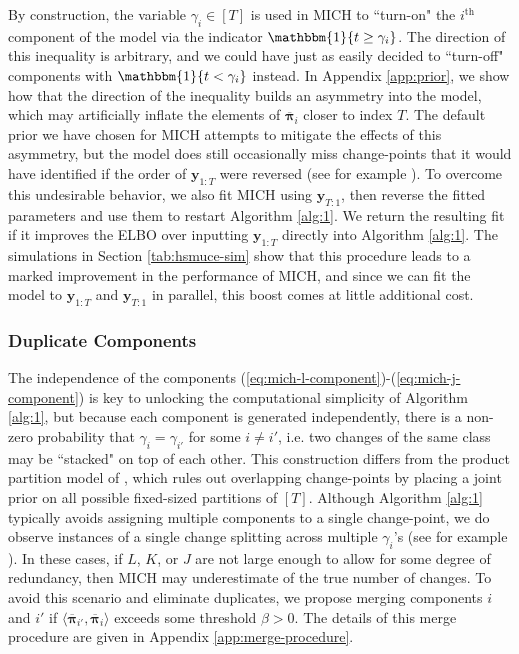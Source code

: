 By construction, the variable $\gamma_i \in [T]$ is used in MICH to ``turn-on" the $i^{\text{th}}$ component of the model via the indicator $\mathbbm{1}\{t \geq \gamma_i\}$. The direction of this inequality is arbitrary, and we could have just as easily decided to ``turn-off" components with  $\mathbbm{1}\{t < \gamma_i\}$ instead. In Appendix \ref{app:prior}, we show how that the direction of the inequality builds an asymmetry into the model, which may artificially inflate the elements of $\overline{\boldsymbol{\pi}}_{i}$ closer to index $T$. The default prior we have chosen for MICH attempts to mitigate the effects of this asymmetry, but the model does still occasionally miss change-points that it would have identified if the order of $\mathbf{y}_{1:T}$ were reversed (see for example ). To overcome this undesirable behavior, we also fit MICH using $\mathbf{y}_{T:1}$, then reverse the fitted parameters and use them to restart Algorithm \ref{alg:1}. We return the resulting fit if it improves the ELBO over inputting $\mathbf{y}_{1:T}$ directly into Algorithm \ref{alg:1}. The simulations in Section \ref{tab:hsmuce-sim} show that this procedure leads to a marked improvement in the performance of MICH, and since we can fit the model to $\mathbf{y}_{1:T}$ and $\mathbf{y}_{T:1}$ in parallel, this boost comes at little additional cost. 

\subsubsection{Duplicate Components}
\label{sec:merge-procedure}

The independence of the components (\ref{eq:mich-l-component})-(\ref{eq:mich-j-component}) is key to unlocking the computational simplicity of Algorithm \ref{alg:1}, but because each component is generated independently, there is a non-zero probability that $\gamma_i = \gamma_{i'}$ for some $i \neq i'$, i.e. two changes of the same class may be ``stacked" on top of each other. This construction differs from the product partition model of \cite{Barry93}, which rules out overlapping change-points by placing a joint prior on all possible fixed-sized partitions of $[T]$. Although Algorithm \ref{alg:1} typically avoids assigning multiple components to a single change-point, we do observe instances of a single change splitting across multiple $\gamma_i$'s (see for example ). In these cases, if $L$, $K$, or $J$ are not large enough to allow for some degree of redundancy, then MICH may underestimate of the true number of changes. To avoid this scenario and eliminate duplicates, we propose merging components $i$ and $i'$ if $\langle\overline{\boldsymbol{\pi}}_{i'}, \overline{\boldsymbol{\pi}}_i \rangle$ exceeds some threshold $\beta > 0$. The details of this merge procedure are given in Appendix \ref{app:merge-procedure}.
